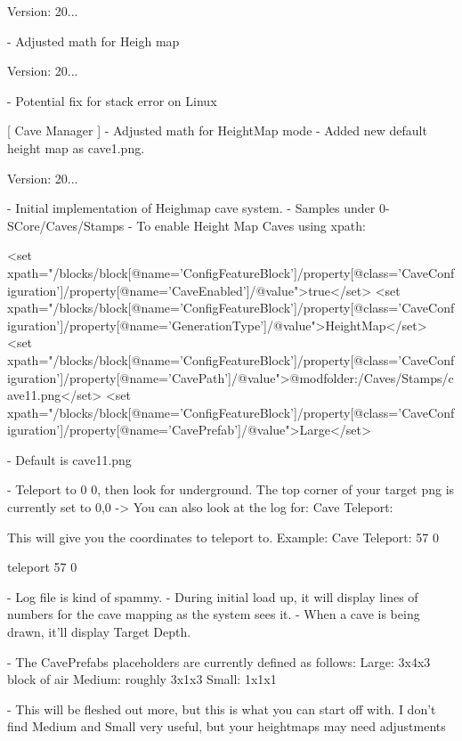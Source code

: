 Version\+: 20... \begin{DoxyVerb}
    - Adjusted math for Heigh map
\end{DoxyVerb}
 Version\+: 20... \begin{DoxyVerb}
    - Potential fix for stack error on Linux

[ Cave Manager ]
    - Adjusted math for HeightMap mode
    - Added new default height map as cave1.png.
\end{DoxyVerb}
 Version\+: 20... \begin{DoxyVerb}
    - Initial implementation of Heighmap cave system.
    - Samples under 0-SCore/Caves/Stamps
    - To enable Height Map Caves using xpath:

        <set xpath="/blocks/block[@name='ConfigFeatureBlock']/property[@class='CaveConfiguration']/property[@name='CaveEnabled']/@value">true</set>
        <set xpath="/blocks/block[@name='ConfigFeatureBlock']/property[@class='CaveConfiguration']/property[@name='GenerationType']/@value">HeightMap</set>
        <set xpath="/blocks/block[@name='ConfigFeatureBlock']/property[@class='CaveConfiguration']/property[@name='CavePath']/@value">@modfolder:/Caves/Stamps/cave11.png</set>
        <set xpath="/blocks/block[@name='ConfigFeatureBlock']/property[@class='CaveConfiguration']/property[@name='CavePrefab']/@value">Large</set>

    - Default is cave11.png

    - Teleport to 0 0, then look for underground. The top corner of your target png is currently set to 0,0
        -> You can also look at the log for:
            Cave Teleport: 

            This will give you the coordinates to teleport to. Example:
                Cave Teleport: 57 0

                teleport 57 0

    - Log file is kind of spammy.
        - During initial load up, it will display lines of numbers for the cave mapping as the system sees it.
        - When a cave is being drawn, it'll display Target Depth.

    - The CavePrefabs placeholders are currently defined as follows:
        Large:  3x4x3 block of air
        Medium: roughly 3x1x3
        Small:  1x1x1

        - This will be fleshed out more, but this is what you can start off with. I don't find Medium and Small very useful, but your heightmaps may need adjustments
\end{DoxyVerb}


